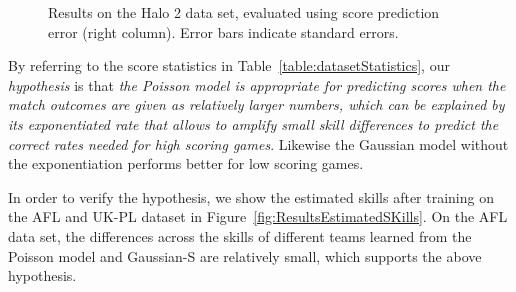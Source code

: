 \begin{center}
\begin{figure*}[t!]
 \centering
\caption{\small Results on the Halo 2 data set, evaluated using score
prediction error (right column). Error bars indicate
standard errors.}
\label{fig:ScoreError_Halo}
\end{figure*}
\end{center}


\COMMENT
By referring to the score
statistics in Table~\ref{table:datasetStatistics}, our {\it
hypothesis} is that {\it the Poisson model is appropriate for
predicting scores when the match outcomes are given as relatively
larger numbers, which can be explained by its exponentiated rate that
allows to amplify small skill differences to predict the correct rates
needed for high scoring games}. Likewise the Gaussian model without
the exponentiation performs better for low scoring games.

In order to verify the hypothesis, we show the estimated skills after
training on the AFL and UK-PL dataset in
Figure~\ref{fig:ResultsEstimatedSKills}. On the AFL data set, the
differences across the skills of different teams learned from the
Poisson model and Gaussian-S are relatively small, which supports the
above hypothesis.

\ENDCOMMENT

